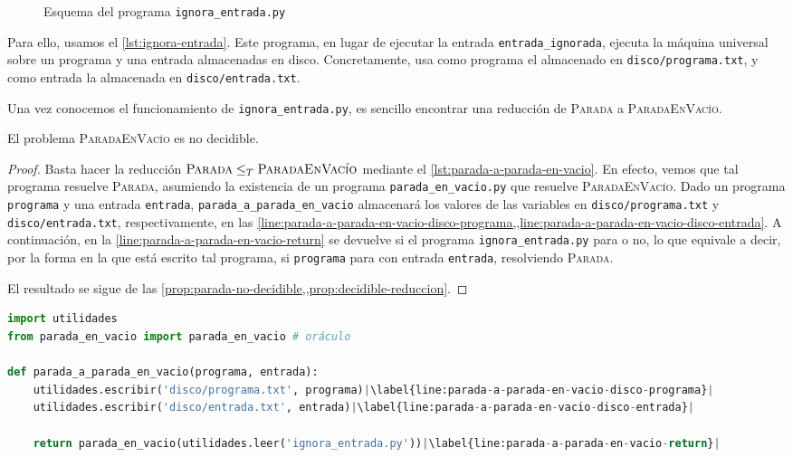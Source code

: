 \begin{figure}[H]
\centering

\caption{Esquema del programa \texttt{ignora\_entrada.py}}
\label{fig:ignora-entrada}
\end{figure}

Para ello, usamos el \cref{lst:ignora-entrada}. Este programa, en lugar de ejecutar la entrada \linebreak\texttt{entrada\_ignorada}, ejecuta la máquina universal sobre un programa y una entrada almacenadas en disco. Concretamente, usa como programa el almacenado en \texttt{disco/programa.txt}, y como entrada la almacenada en \texttt{disco/entrada.txt}.

Una vez conocemos el funcionamiento de \texttt{ignora\_entrada.py}, es sencillo encontrar una reducción de \textsc{Parada} a \textsc{ParadaEnVacío}.

\begin{proposicion}\label{prop:parada-en-vacio-no-decidible}
El problema \textsc{ParadaEnVacío} es no decidible.
\end{proposicion}
\begin{proof}
Basta hacer la reducción $\textsc{Parada}\leq_T\textsc{ParadaEnVacío}$ mediante el \cref{lst:parada-a-parada-en-vacio}. En efecto, vemos que tal programa resuelve \textsc{Parada}, asumiendo la existencia de un programa \texttt{parada\_en\_vacio.py} que resuelve \textsc{ParadaEnVacío}. Dado un programa \texttt{programa} y una entrada \texttt{entrada}, \texttt{parada\_a\_parada\_en\_vacio} almacenará los valores de las variables en \texttt{disco/programa.txt} y \texttt{disco/entrada.txt}, respectivamente, en las \cref{line:parada-a-parada-en-vacio-disco-programa,,line:parada-a-parada-en-vacio-disco-entrada}. A continuación, en la \cref{line:parada-a-parada-en-vacio-return} se devuelve si el programa \texttt{ignora\_entrada.py} para o no, lo que equivale a decir, por la forma en la que está escrito tal programa, si \texttt{programa} para con entrada \texttt{entrada}, resolviendo \textsc{Parada}.

El resultado se sigue de las \cref{prop:parada-no-decidible,,prop:decidible-reduccion}.
\end{proof}

\begin{lstlisting}[language=Python, caption=\lstinline{parada_a_parada_en_vacio.py},label={lst:parada-a-parada-en-vacio}]
import utilidades
from parada_en_vacio import parada_en_vacio # oráculo

def parada_a_parada_en_vacio(programa, entrada):
    utilidades.escribir('disco/programa.txt', programa)|\label{line:parada-a-parada-en-vacio-disco-programa}|
    utilidades.escribir('disco/entrada.txt', entrada)|\label{line:parada-a-parada-en-vacio-disco-entrada}|

    return parada_en_vacio(utilidades.leer('ignora_entrada.py'))|\label{line:parada-a-parada-en-vacio-return}|
\end{lstlisting}

